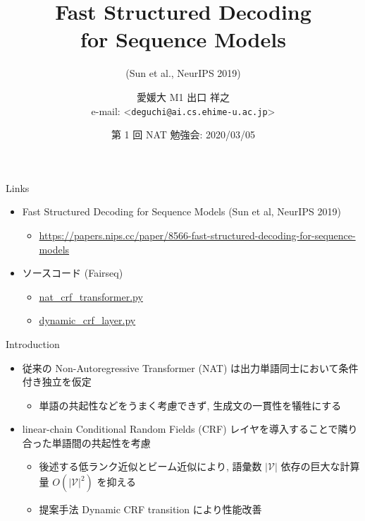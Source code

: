 \documentclass[unicode, 12pt, aspectratio=43]{beamer}
\author{愛媛大 M1 出口 祥之 \\ \small{e-mail: <\texttt{deguchi@ai.cs.ehime-u.ac.jp}>}}
\date{第 1 回 NAT 勉強会: 2020/03/05}
\title{Fast Structured Decoding \\ for Sequence Models}
\subtitle{(Sun et al., NeurIPS 2019)}
\begin{document}
\maketitle

\begin{frame}[label={sec:org085a8f9}]{Links}
\begin{itemize}
\item Fast Structured Decoding for Sequence Models (Sun et al, NeurIPS 2019)
\begin{itemize}
\item \href{https://papers.nips.cc/paper/8566-fast-structured-decoding-for-sequence-models}{\url{https://papers.nips.cc/paper/8566-fast-structured-decoding-for-sequence-models}}
\end{itemize}

\item ソースコード (Fairseq)
\begin{itemize}
\item \href{https://github.com/pytorch/fairseq/blob/master/fairseq/models/nat/nat\_crf\_transformer.py}{\url{nat_crf_transformer.py}}
\item \href{https://github.com/pytorch/fairseq/blob/master/fairseq/modules/dynamic\_crf\_layer.py}{\url{dynamic_crf_layer.py}}
\end{itemize}
\end{itemize}
\end{frame}

\begin{frame}[label={sec:orgd29b1cc}]{Introduction}
\begin{itemize}
\item 従来の Non-Autoregressive Transformer (NAT) は出力単語同士において条件付き独立を仮定
\begin{itemize}
\item 単語の共起性などをうまく考慮できず, 生成文の一貫性を犠牲にする
\end{itemize}

\item linear-chain Conditional Random Fields (CRF) レイヤを導入することで隣り合った単語間の共起性を考慮
\begin{itemize}
\item 後述する低ランク近似とビーム近似により, 語彙数 \(|\mathcal{V}|\) 依存の巨大な計算量 \(O(|\mathcal{V}|^2)\) を抑える
\item 提案手法 Dynamic CRF transition により性能改善
\end{itemize}
\end{itemize}
\end{frame}
\end{document}
